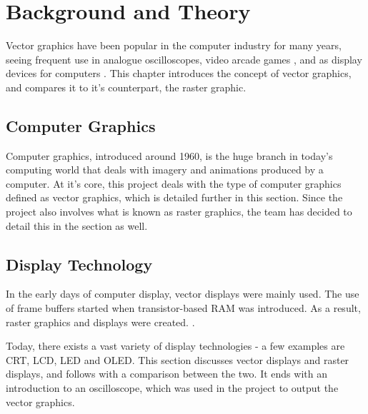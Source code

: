 \chapter{Background and Theory}

Vector graphics have been popular in the computer industry for many years,
seeing frequent use in analogue oscilloscopes, video arcade games \cite{astroids},
and as display devices for computers \cite{ibm2250}\cite{tektronix4010}. 
This chapter introduces the concept of vector graphics, and compares it to it's counterpart, the raster graphic.

\section{Computer Graphics}
Computer graphics, introduced around 1960\cite[sec. 1.1.1]{graphics-visualization-algorithms}, is the huge branch in today's computing world that deals with imagery and animations produced by a computer.
At it's core, this project deals with the type of computer graphics defined as vector graphics, which is detailed further in this section. 
Since the project also involves what is known as raster graphics, the team has decided to detail this in the section as well.





\section{Display Technology}
In the early days of computer display, vector displays were mainly used.
The use of frame buffers started when transistor-based RAM was introduced.
As a result, raster graphics and displays were created. \cite[sec. 1.1]{graphics-visualization-algorithms}.

Today, there exists a vast variety of display technologies - a few examples are CRT, LCD, LED and OLED.
This section discusses vector displays and raster displays, and follows with a comparison between the two. It ends with an introduction to an oscilloscope, which was used in the project to output the vector graphics.






